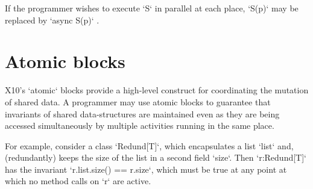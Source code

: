 If the programmer wishes to execute \xcd`S` in parallel at each place,
\xcd`S(p)` may be replaced by 
\xcd`async S(p)`
.




\section{Atomic blocks}\label{AtomicBlocks}

X10's \xcd`atomic` blocks provide a high-level construct for coordinating
the mutation of shared data. 
A programmer may use atomic blocks to guarantee that invariants of
shared data-structures are maintained even as they are being accessed
simultaneously by multiple activities running in the same place.  

For example, consider a class \xcd`Redund[T]`, which encapsulates a list
\xcd`list` and, (redundantly) keeps the size of the list in a second field
\xcd`size`.  Then \xcd`r:Redund[T]` has the invariant 
\xcd`r.list.size() == r.size`, which must be true at any point at which
no method calls on \xcd`r` are active.

